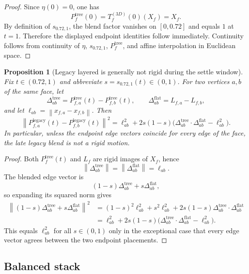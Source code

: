 \documentclass[11pt]{article}
\newtheorem{proposition}[definition]{Proposition}
\theoremstyle{remark}
\newcommand{\norm}[1]{\left\lVert #1 \right\rVert}
\begin{document}
\begin{proof}
Since $\eta(0)=0$, one has
\[
P_f^{\mathrm{tree}}(0)=T_f^{(3D)}(0)(X_f)=X_f.
\]
By definition of $s_{0.72,1}$, the blend factor vanishes on $[0,0.72]$ and
equals $1$ at $t=1$. Therefore the displayed endpoint identities follow
immediately. Continuity follows from continuity of $\eta$, $s_{0.72,1}$,
$P_f^{\mathrm{tree}}$, and affine interpolation in Euclidean space.
\end{proof}

\begin{proposition}[Legacy layered is generally not rigid during the settle window]
Fix $t\in(0.72,1)$ and abbreviate $s=s_{0.72,1}(t)\in(0,1)$. For two vertices
$a,b$ of the same face, let
\[
\Delta_{ab}^{\mathrm{tree}}
=
P_{f,a}^{\mathrm{tree}}(t)-P_{f,b}^{\mathrm{tree}}(t),
\qquad
\Delta_{ab}^{\mathrm{flat}}
=
L_{f,a}-L_{f,b},
\]
and let $\ell_{ab}=\norm{x_{f,a}-x_{f,b}}$. Then
\[
\norm{P_{f,a}^{\mathrm{legacy}}(t)-P_{f,b}^{\mathrm{legacy}}(t)}^2
=
\ell_{ab}^2
+
2s(1-s)\bigl(
\Delta_{ab}^{\mathrm{tree}}\cdot\Delta_{ab}^{\mathrm{flat}}
-\ell_{ab}^2
\bigr).
\]
In particular, unless the endpoint edge vectors coincide for every edge of the
face, the late legacy blend is not a rigid motion.
\end{proposition}

\begin{proof}
Both $P_f^{\mathrm{tree}}(t)$ and $L_f$ are rigid images of $X_f$, hence
\[
\norm{\Delta_{ab}^{\mathrm{tree}}}
=
\norm{\Delta_{ab}^{\mathrm{flat}}}
=
\ell_{ab}.
\]
The blended edge vector is
\[
(1-s)\Delta_{ab}^{\mathrm{tree}}+s\Delta_{ab}^{\mathrm{flat}},
\]
so expanding its squared norm gives
\begin{align*}
\norm{(1-s)\Delta_{ab}^{\mathrm{tree}}+s\Delta_{ab}^{\mathrm{flat}}}^2
&=
(1-s)^2\ell_{ab}^2+s^2\ell_{ab}^2
+2s(1-s)\Delta_{ab}^{\mathrm{tree}}\cdot\Delta_{ab}^{\mathrm{flat}}\\
&=
\ell_{ab}^2
+2s(1-s)\bigl(
\Delta_{ab}^{\mathrm{tree}}\cdot\Delta_{ab}^{\mathrm{flat}}
-\ell_{ab}^2
\bigr).
\end{align*}
This equals $\ell_{ab}^2$ for all $s\in(0,1)$ only in the exceptional case that
every edge vector agrees between the two endpoint placements.
\end{proof}

\subsection*{Balanced stack}
\end{document}
